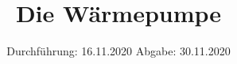 

\subject{VERSUCH 206}
\title{Die Wärmepumpe}
\date{%
  Durchführung: 16.11.2020
  \hspace{3em}
  Abgabe: 30.11.2020
}



\maketitle
\thispagestyle{empty}
\tableofcontents
\newpage








\printbibliography{}


